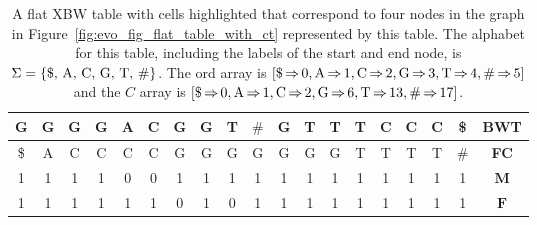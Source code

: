 \documentclass[a4paper,12pt,twoside,BCOR=10mm]{scrbook}
\begin{document}
{
\begin{table}[htb]
\centering
\caption[Flat table corresponding to a graph]{A flat XBW table with cells highlighted that correspond to four nodes in the graph in Figure~\ref{fig:evo_fig_flat_table_with_ct} represented by this table. The alphabet for this table, including the labels of the start and end node, is $ \Sigma = \{ \textup{\$, A, C, G, T, $\#$} \} $. The \textup{ord} array is $ [ \$ {\, \Rightarrow \,} 0, \textup{A} {\, \Rightarrow \,} 1, \textup{C} {\, \Rightarrow \,} 2, \textup{G} {\, \Rightarrow \,} 3, \textup{T} {\, \Rightarrow \,} 4, \textup{$\#$} {\, \Rightarrow \,} 5 ] $ and the $ C $ array is $ [ \$ {\, \Rightarrow \,} 0, \textup{A} {\, \Rightarrow \,} 1, \textup{C} {\, \Rightarrow \,} 2, \textup{G} {\, \Rightarrow \,} 6, \textup{T} {\, \Rightarrow \,} 13, \textup{$\#$} {\, \Rightarrow \,} 17 ] $.}
\begin{tabular}{ | c | c | c | c | c | c | c | c | c | c | c | c | c | c | c | c | c | c | c | }
\hline
G & G & G &\cellcolor{purple_bg}\color{purple_fx}G & A & C & G &\cellcolor{green_bg}\color{green_fx}G &\cellcolor{green_bg}\color{green_fx}T & $\#$ & G & T & T &\cellcolor{red_bg}\color{red_fx}T & C & C &\cellcolor{blue_bg}\color{blue_fx}C & \$ & \textbf{BWT} \\ \hline
\$ & A & C &\cellcolor{purple_bg}\color{purple_fx}C &\cellcolor{purple_bg}\color{purple_fx}C &\cellcolor{purple_bg}\color{purple_fx}C & G & G &\cellcolor{green_bg}\color{green_fx}G & G & G & G & G &\cellcolor{red_bg}\color{red_fx}T & T & T &\cellcolor{blue_bg}\color{blue_fx}T & $\#$ & \textbf{FC} \\ \hline
1 & 1 & 1 &\cellcolor{purple_bg}\color{purple_fx}1 &\cellcolor{purple_bg}\color{purple_fx}0 &\cellcolor{purple_bg}\color{purple_fx}0 & 1 & 1 &\cellcolor{green_bg}\color{green_fx}1 & 1 & 1 & 1 & 1 &\cellcolor{red_bg}\color{red_fx}1 & 1 & 1 &\cellcolor{blue_bg}\color{blue_fx}1 & 1 & $\boldsymbol{M}$ \\ \hline
1 & 1 & 1 &\cellcolor{purple_bg}\color{purple_fx}1 & 1 & 1 & 0 &\cellcolor{green_bg}\color{green_fx}1 &\cellcolor{green_bg}\color{green_fx}0 & 1 & 1 & 1 & 1 &\cellcolor{red_bg}\color{red_fx}1 & 1 & 1 &\cellcolor{blue_bg}\color{blue_fx}1 & 1 & $\boldsymbol{F}$ \\ \hline
\end{tabular}
\label{table:flat_table_with_ct}
\end{table}
}
\end{document}
